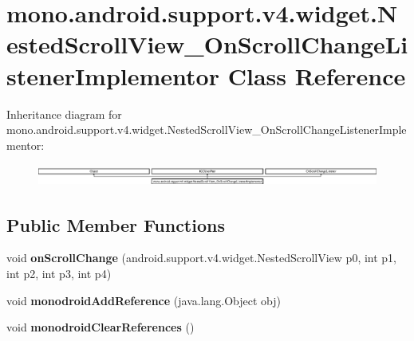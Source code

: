 \hypertarget{classmono_1_1android_1_1support_1_1v4_1_1widget_1_1_nested_scroll_view___on_scroll_change_listener_implementor}{}\section{mono.\+android.\+support.\+v4.\+widget.\+Nested\+Scroll\+View\+\_\+\+On\+Scroll\+Change\+Listener\+Implementor Class Reference}
\label{classmono_1_1android_1_1support_1_1v4_1_1widget_1_1_nested_scroll_view___on_scroll_change_listener_implementor}
Inheritance diagram for mono.\+android.\+support.\+v4.\+widget.\+Nested\+Scroll\+View\+\_\+\+On\+Scroll\+Change\+Listener\+Implementor\+:\begin{figure}[H]
\begin{center}
\leavevmode
\includegraphics[height=0.720721cm]{classmono_1_1android_1_1support_1_1v4_1_1widget_1_1_nested_scroll_view___on_scroll_change_listener_implementor}
\end{center}
\end{figure}
\subsection*{Public Member Functions}
\begin{DoxyCompactItemize}
\item 
\mbox{\label{classmono_1_1android_1_1support_1_1v4_1_1widget_1_1_nested_scroll_view___on_scroll_change_listener_implementor_ae77ca61884b43630951540c3040667fe}} 
void {\bfseries on\+Scroll\+Change} (android.\+support.\+v4.\+widget.\+Nested\+Scroll\+View p0, int p1, int p2, int p3, int p4)
\item 
\mbox{\label{classmono_1_1android_1_1support_1_1v4_1_1widget_1_1_nested_scroll_view___on_scroll_change_listener_implementor_a30cd540fd3bdbc6c89ff9ce53921ae1b}} 
void {\bfseries monodroid\+Add\+Reference} (java.\+lang.\+Object obj)
\item 
\mbox{\label{classmono_1_1android_1_1support_1_1v4_1_1widget_1_1_nested_scroll_view___on_scroll_change_listener_implementor_a51ab24482a8e50779f3d45a756028aff}} 
void {\bfseries monodroid\+Clear\+References} ()
\end{DoxyCompactItemize}
